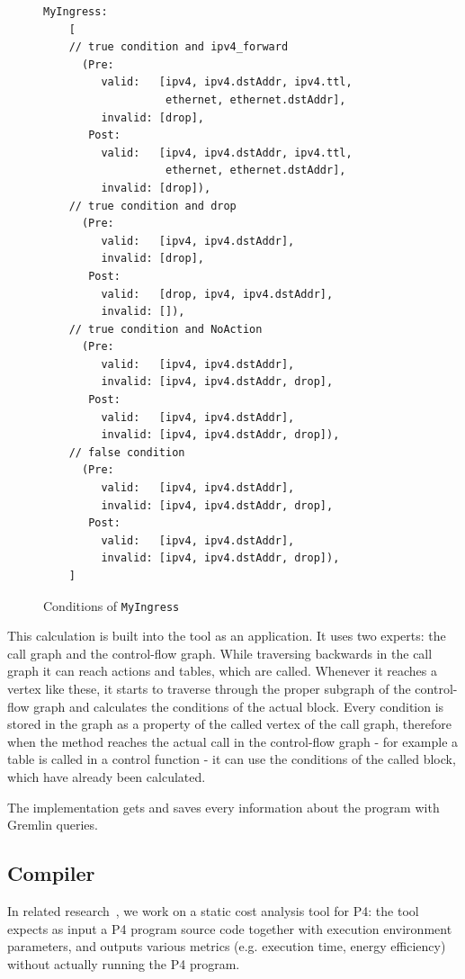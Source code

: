 \documentclass[sigconf]{acmart}
\begin{document}
  \begin{figure}
  	\begin{lstlisting}[language=cond]
  	MyIngress:
  	[
  	// true condition and ipv4_forward
  	  (Pre: 
  	     valid:   [ipv4, ipv4.dstAddr, ipv4.ttl,
  	               ethernet, ethernet.dstAddr],
  	     invalid: [drop],
  	   Post: 
  	     valid:   [ipv4, ipv4.dstAddr, ipv4.ttl,
  	               ethernet, ethernet.dstAddr],
  	     invalid: [drop]),
  	// true condition and drop
  	  (Pre: 
  	     valid:   [ipv4, ipv4.dstAddr],
  	     invalid: [drop],
  	   Post: 
  	     valid:   [drop, ipv4, ipv4.dstAddr],
  	     invalid: []),
  	// true condition and NoAction
  	  (Pre: 
  	     valid:   [ipv4, ipv4.dstAddr],
  	     invalid: [ipv4, ipv4.dstAddr, drop],
  	   Post: 
  	     valid:   [ipv4, ipv4.dstAddr],
  	     invalid: [ipv4, ipv4.dstAddr, drop]),
   	// false condition
   	  (Pre: 
   	     valid:   [ipv4, ipv4.dstAddr],
   	     invalid: [ipv4, ipv4.dstAddr, drop],
   	   Post: 
   	     valid:   [ipv4, ipv4.dstAddr],
   	     invalid: [ipv4, ipv4.dstAddr, drop]), 
   	]
  	\end{lstlisting}
  	\caption{Conditions of \texttt{MyIngress}}
  	\label{code:cond}
  \end{figure}
  
   This calculation is built into the tool as an application. It uses two experts: the call graph and the control-flow graph. While traversing backwards in the call graph it can reach actions and tables, which are called. Whenever it reaches a vertex like these, it starts to traverse through the proper subgraph of the control-flow graph and calculates the conditions of the actual block. Every condition is stored in the graph as a property of the called vertex of the call graph, therefore when the method reaches the actual call in the control-flow graph - for example a table is called in a control function - it can use the conditions of the called block, which have already been calculated.
   
   The implementation gets and saves every information about the program with Gremlin queries.
  
  \subsection{Compiler} %
  In related research~\cite{cscs18,LukacsOcs}, we work on a static cost analysis tool for P4: the tool expects as input a P4 program source code together with execution environment parameters, and outputs various metrics (e.g. execution time, energy efficiency) without actually running the P4 program.
\end{document}
